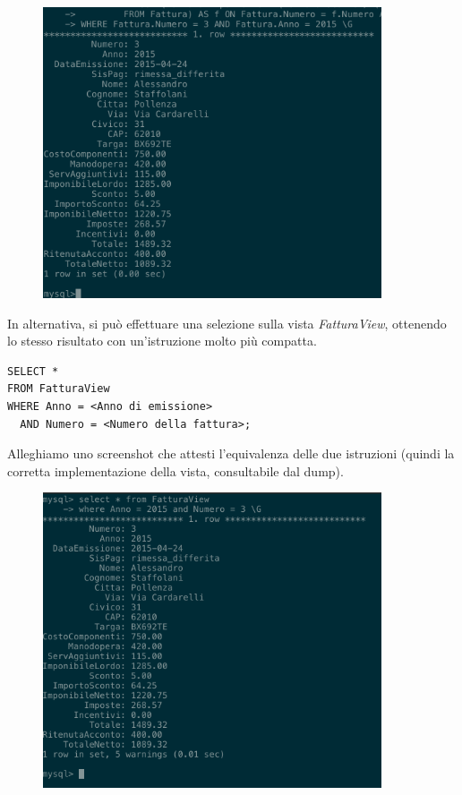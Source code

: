 \begin{description}
              \begin{figure}[H]
                \centering
                \includegraphics[width=10cm]{images/screenshots/show_intestazione_fattura_2.png}
              \end{figure}

              In alternativa, si può effettuare una selezione sulla vista \emph{FatturaView}, ottenendo lo stesso risultato con un'istruzione molto più compatta.

              \begin{lstlisting}
SELECT *
FROM FatturaView
WHERE Anno = <Anno di emissione> 
  AND Numero = <Numero della fattura>;
              \end{lstlisting}

              Alleghiamo uno screenshot che attesti l'equivalenza delle due istruzioni (quindi la corretta implementazione della vista, consultabile dal dump).

              \begin{figure}[H]
                \centering
                \includegraphics[width=10cm]{images/screenshots/show_fattura_view.png}
              \end{figure}


\end{description}
